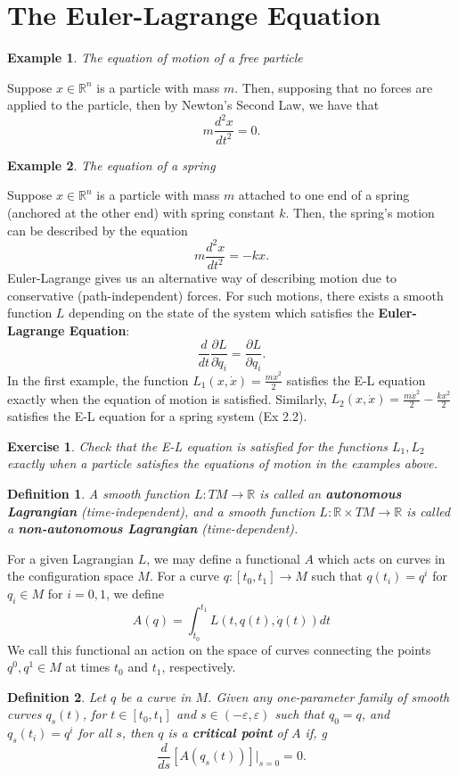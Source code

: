 \documentclass{article}
\newcommand{\R}{\mathbb R}
\newcommand{\eps}{\varepsilon}
\newcommand{\pdof}[2]{\frac{\partial #1}{\partial #2}}
\newtheorem{ex}{Example}
\newtheorem{exercise}{Exercise}
\newtheorem{defn}{Definition}
\begin{document}
\section{The Euler-Lagrange Equation}
\begin{ex}
    The equation of motion of a free particle
\end{ex}
Suppose $x\in\R^n$ is a particle with mass $m$. Then, supposing that no forces are applied to the particle, then by Newton's Second Law, we have that
\[m\frac{d^2x}{dt^2} = 0.\]
\begin{ex}
    The equation of a spring
\end{ex}
Suppose $x\in\R^n$ is a particle with mass $m$ attached to one end of a spring (anchored at the other end) with spring constant $k$. Then, the spring's motion can be described by the equation
\[m\frac{d^2x}{dt^2} = -kx.\]
\newline
Euler-Lagrange gives us an alternative way of describing motion due to conservative (path-independent) forces. For such motions, there exists a smooth function $L$ depending on the state of the system which satisfies the \textbf{Euler-Lagrange Equation}:
\[\frac{d}{dt}\pdof{L}{\dot q_i} = \pdof{L}{q_i}.\]
In the first example, the function $L_1(x,\dot x) = \frac{m\dot x^2}{2}$ satisfies the E-L equation exactly when the equation of motion is satisfied. Similarly, $L_2(x,\dot x) = \frac{m\dot x^2}{2}-\frac{kx^2}{2}$ satisfies the E-L equation for a spring system (Ex 2.2).
\newline
\begin{exercise}
    Check that the E-L equation is satisfied for the functions $L_1,L_2$ exactly when a particle satisfies the equations of motion in the examples above.
\end{exercise}
\begin{defn}
    A smooth function $L:TM\to \R$ is called an \textbf{autonomous Lagrangian} (time-independent), and a smooth function $L:\R\times TM\to \R$ is called a \textbf{non-autonomous Lagrangian} (time-dependent).
\end{defn}
For a given Lagrangian $L$, we may define a functional $A$ which acts on curves in the configuration space $M$. For a curve $q:[t_0,t_1]\to M$ such that $q(t_i) = q^i$ for $q_i\in M$ for $i=0,1$, we define
\[A(q) = \int_{t_0}^{t_1}L(t,q(t),\dot q(t))dt\]
We call this functional an action on the space of curves connecting the points $q^0,q^1\in M$ at times $t_0$ and $t_1$, respectively.
\newline
\begin{defn}
    Let $q$ be a curve in $M$. Given any one-parameter family of smooth curves $q_s(t)$, for $t\in [t_0,t_1]$ and $s\in (-\eps,\eps)$ such that $q_0 = q$, and $q_s(t_i) = q^i$ for all $s$, then $q$ is a \textbf{critical point} of $A$ if, g
\[\frac{d}{ds}[A(q_s(t))]\Big|_{s=0} = 0.\]
\end{defn} 
\end{document}
